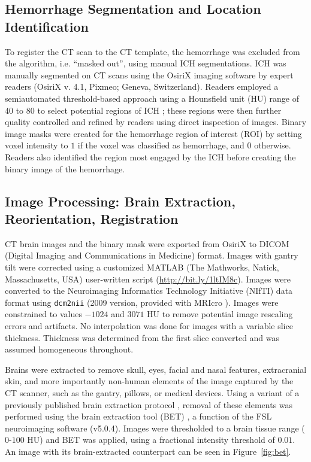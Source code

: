 \documentclass[10pt]{article}\usepackage[]{graphicx}\usepackage[]{color}
\begin{document}
\subsection*{Hemorrhage Segmentation and Location Identification}
To register the CT scan to the CT template, the hemorrhage was excluded from the algorithm, i.e. ``masked out'', using manual ICH segmentations.  ICH was manually segmented on CT scans using the OsiriX imaging software by expert readers (OsiriX v. 4.1, Pixmeo; Geneva, Switzerland).  Readers employed a semiautomated threshold-based approach using a Hounsfield unit (HU) range of $40$ to $80$ to select potential regions of ICH \citep{bergstrom_variation_1977, smith_imaging_2006}; these regions were then further quality controlled and refined by readers using direct inspection of images.  Binary image masks were created for the hemorrhage region of interest (ROI) by setting voxel intensity to $1$ if the voxel was classified as hemorrhage, and $0$ otherwise.  Readers also identified the region most engaged by the ICH before creating the binary image of the hemorrhage.

\subsection*{Image Processing: Brain Extraction, Reorientation, Registration}
CT brain images and the binary mask were exported from OsiriX to DICOM (Digital Imaging and Communications in Medicine) format.  Images with gantry tilt were corrected using a customized MATLAB (The Mathworks, Natick, Massachusetts, USA) user-written script ({\scriptsize \url{http://bit.ly/1ltIM8c}}). 
Images were converted to the Neuroimaging Informatics Technology Initiative (NIfTI) data format using \verb|dcm2nii| (2009 version, provided with MRIcro \citep{rorden_stereotaxic_2000}).  Images were constrained to values $-1024$ and $3071$ HU to remove potential image rescaling errors and artifacts.  No interpolation was done for images with a variable slice thickness. Thickness was determined from the first slice converted and was assumed homogeneous throughout.  

Brains were extracted to remove skull, eyes, facial and nasal features, extracranial skin, and more importantly non-human elements of the image captured by the CT scanner, such as the gantry, pillows, or medical devices.  Using a variant of a previously published brain extraction protocol \citep{rorden_age-specific_2012}, removal of these elements was performed using the brain extraction tool (BET) \citep{smith_fast_2002}, a function of the FSL \citep{jenkinson_fsl_2012} neuroimaging software (v5.0.4).  Images were thresholded to a brain tissue range ($0$-$100$ HU) and BET was applied, using a fractional intensity threshold of $0.01$.  An image with its brain-extracted counterpart can be seen in Figure~\ref{fig:bet}.  
\end{document}
